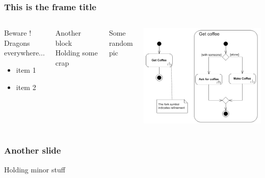 \begin{frame}
\frametitle{This is the frame title}

\begin{columns}

\begin{block}{Beware !}
Dragons everywhere...
\begin{itemize}[<+->]
\item item 1
\item item 2
\end{itemize}
\end{block}

\begin{exampleblock}{Another block}
Holding some crap
\end{exampleblock}

Some random pic

\includegraphics[width=\textwidth]{img/coffee}

\end{columns}
\end{frame}
\begin{frame}
\frametitle{Another slide}

Holding minor stuff

\end{frame}


